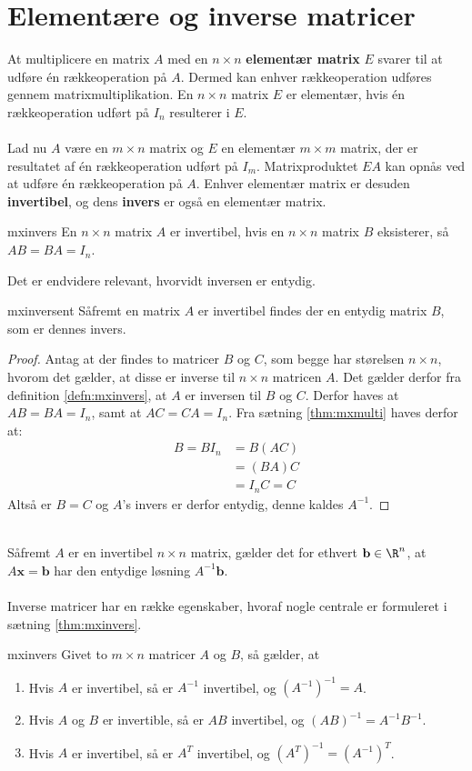 \section{Elementære og inverse matricer}
At multiplicere en matrix $A$ med en $n \times n$ \textbf{elementær matrix} $E$ svarer til at udføre én rækkeoperation på $A$. 
Dermed kan enhver rækkeoperation udføres gennem matrixmultiplikation. 
En $n \times n$ matrix $E$ er elementær, hvis én rækkeoperation udført på $I_n$ resulterer i $E$. 
\\\\
Lad nu $A$ være en $m \times n$ matrix og $E$ en elementær $m \times m$ matrix, der er resultatet af én rækkeoperation udført på $I_m$. 
Matrixproduktet $EA$ kan opnås ved at udføre én rækkeoperation på $A$. 
Enhver elementær matrix er desuden \textbf{invertibel}, og dens \textbf{invers} er også en elementær matrix. 
%
\begin{defn}{}{mxinvers}
En $n \times n$ matrix $A$ er invertibel, hvis en $n \times n$ matrix $B$ eksisterer, så $AB=BA=I_n$. 
\end{defn}
\noindent
%
Det er endvidere relevant, hvorvidt inversen er entydig.
\begin{thm}{}{mxinversent}
Såfremt en matrix $A$ er invertibel findes der en entydig matrix $B$, som er dennes invers.
\end{thm}
%
\begin{proof}
Antag at der findes to matricer  $B$ og $C$, som begge har størelsen $n \times n$, hvorom det gælder, at disse er inverse til $n \times n$ matricen $A$.
Det gælder derfor fra definition \ref{defn:mxinvers}, at $A$ er inversen til $B$ og $C$.
Derfor haves at $AB=BA=I_{n}$, samt at $AC=CA=I_{n}$. 
Fra sætning \ref{thm:mxmulti} haves derfor at:
\begin{align*}
B=BI_n&=B(AC) \\
&=(BA)C \\
&=I_nC=C
\end{align*} 
Altså er $B=C$ og $A$'s invers er derfor entydig, denne kaldes $A^{-1}$.
\end{proof} \\
%
Såfremt $A$ er en invertibel $n \times n$ matrix, gælder det for ethvert $\mathbf{b} \in \R^n$, at $A\textbf{x}=\mathbf{b}$ har den entydige løsning $A^{-1}\mathbf{b}$. \\\\
%
Inverse matricer har en række egenskaber, hvoraf nogle centrale er formuleret i sætning \ref{thm:mxinvers}. 
%
\begin{thm}{}{mxinvers}
Givet to $m \times n$ matricer $A$ og $B$, så gælder, at
\begin{enumerate}[label=(\alph*)]
\item Hvis $A$ er invertibel, så er $A^{-1}$ invertibel, og $(A^{-1})^{-1}=A$.
\item Hvis $A$ og $B$ er invertible, så er $AB$ invertibel, og $(AB)^{-1}=A^{-1}B^{-1}$.
\item Hvis $A$ er invertibel, så er $A^T$ invertibel, og $(A^T)^{-1}=(A^{-1})^T$.
\end{enumerate}
\end{thm}
